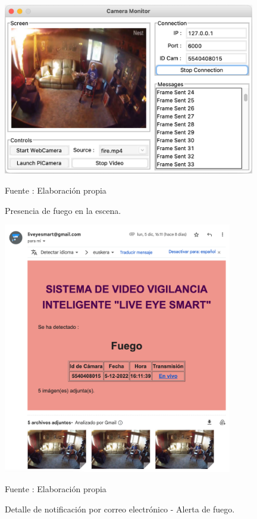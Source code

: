 \begin{figure}[H]
    \begin{center}
        \includegraphics[width=11cm]{img/capitulo_6/fire.png}
    \end{center}
    \begin{center}
        \caption{Presencia de fuego en la escena.}
        Fuente : Elaboración propia
    \end{center}
\end{figure}

\begin{figure}[H]
    \begin{center}
        \includegraphics[width=10cm]{img/capitulo_6/mail_fire.png}
    \end{center}
    \begin{center}
        \caption{Detalle de notificación por correo electrónico - Alerta de fuego.}
        Fuente : Elaboración propia
    \end{center}
\end{figure}

